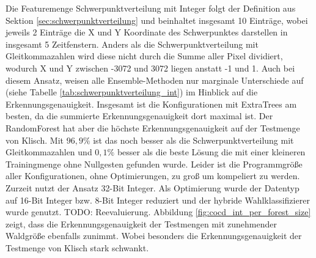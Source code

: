 Die Featuremenge Schwerpunktverteilung mit Integer folgt der Definition aus Sektion \ref{sec:schwerpunktverteilung} und beinhaltet insgesamt 10 Einträge, wobei jeweils 2 Einträge die X und Y
Koordinate des Schwerpunktes darstellen in insgesamt 5 Zeitfenstern. Anders als die Schwerpunktverteilung mit Gleitkommazahlen wird diese nicht durch die Summe aller Pixel dividiert, wodurch
X und Y zwischen -3072 und 3072 liegen anstatt -1 und 1.
\newline
\newline
Auch bei diesem Ansatz, weisen alle Ensemble-Methoden nur marginale Unterschiede auf (siehe Tabelle \ref{tab:schwerpunktverteilung_int}) im Hinblick auf die Erkennungsgenauigkeit. Insgesamt ist
die Konfigurationen mit ExtraTrees am besten, da die summierte Erkennungsgenauigkeit dort maximal ist. Der RandomForest hat aber die höchste Erkennungsgenauigkeit auf der Testmenge von Klisch.
Mit $96,9\%$ ist das noch besser als die Schwerpunktverteilung mit Gleitkommazahlen und $0,1\%$ besser als die beste Lösung die mit einer kleineren Trainingmenge ohne Nullgesten gefunden wurde.
\newline
\newline
Leider ist die Programmgröße aller Konfigurationen, ohne Optimierungen, zu groß um kompeliert zu werden. Zurzeit nutzt der Ansatz 32-Bit Integer. Als Optimierung wurde der Datentyp auf 16-Bit
Integer bzw. 8-Bit Integer reduziert und der hybride Wahlklassifizierer wurde genutzt. TODO: Reevaluierung.
\newline
\newline
Abbildung \ref{fig:cocd_int_per_forest_size} zeigt, dass die Erkennungsgenauigkeit der Testmengen mit zunehmender Waldgröße ebenfalls zunimmt. Wobei besonders die Erkennungsgenauigkeit der
Testmenge von Klisch stark schwankt.
